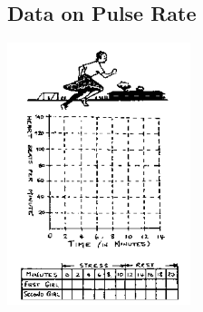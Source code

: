 \begin{multicols}{2}
%
%

\subsection{Data on Pulse Rate}

\begin{center}
\includegraphics[width=0.4\textwidth]{./img/source/data-pulse.png}
\end{center}


\end{multicols}
